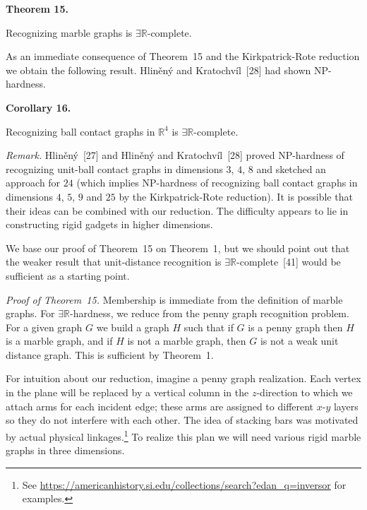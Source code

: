 \documentclass{article}
\begin{document}
\par\medskip\noindent\textbf{Theorem 15.} \begin{itshape}
 Recognizing marble graphs is \ensuremath{\exists\mathbb{R}}-complete.
\end{itshape}\par\medskip

As an immediate consequence of Theorem~15 and the Kirkpatrick-Rote reduction we obtain the following result. Hliněný and Kratochvíl~[28] had shown \textsf{NP}-hardness.

\par\medskip\noindent\textbf{Corollary 16.} \begin{itshape}
    Recognizing ball contact graphs in $\ensuremath{\mathbb{R}}^4$ is \ensuremath{\exists\mathbb{R}}-complete. 
\end{itshape}\par\medskip

\par\medskip\noindent\textit{Remark.} 
Hliněný~[27] and Hliněný and Kratochvíl~[28] proved \textsf{NP}-hardness of recognizing unit-ball contact graphs in dimensions $3$, $4$, $8$ and sketched an approach for $24$ (which implies \textsf{NP}-hardness of recognizing ball contact graphs in dimensions $4$, $5$, $9$ and $25$ by the Kirkpatrick-Rote reduction). It is possible that their ideas can be combined with our reduction. The difficulty appears to lie in constructing rigid gadgets in higher dimensions. 
\par\medskip

We base our proof of Theorem~15 on Theorem~1, but we should point out that the weaker result that unit-distance recognition is \ensuremath{\exists\mathbb{R}}-complete~[41] would be sufficient as a starting point.

\par\noindent\textit{Proof of Theorem~15.} 
    Membership is immediate from the definition of marble graphs. For \ensuremath{\exists\mathbb{R}}-hardness, we reduce from the penny graph recognition problem. For a given graph $G$ we build a graph $H$ such that if $G$ is a penny graph then $H$ is a marble graph, and if $H$ is not a marble graph, then $G$ is not a weak unit distance graph. This is sufficient by Theorem~1.

For intuition about our reduction, imagine a penny graph realization.  Each vertex in the plane will be replaced by a vertical column in the $z$-direction to which we attach arms for each incident edge; these arms are assigned to different $x$-$y$ layers so they do not interfere with each other.
The idea of stacking bars was motivated by actual physical linkages.\footnote{See \url{https://americanhistory.si.edu/collections/search?edan_q=inversor} for examples.}
To realize this plan we will need various rigid marble graphs in three dimensions.
\end{document}

